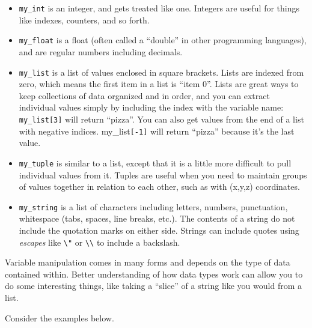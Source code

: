 \begin{itemize}
\tightlist
\item
  \texttt{my\_int} is an integer, and gets treated like one. Integers
  are useful for things like indexes, counters, and so forth.
\item
  \texttt{my\_float} is a float (often called a ``double'' in other
  programming languages), and are regular numbers including decimals.
\item
  \texttt{my\_list} is a list of values enclosed in square brackets.
  Lists are indexed from zero, which means the first item in a list is
  ``item 0''. Lists are great ways to keep collections of data organized
  and in order, and you can extract individual values simply by
  including the index with the variable name: \texttt{my\_list{[}3{]}}
  will return ``pizza''. You can also get values from the end of a list
  with negative indices. my\_list\texttt{{[}-1{]}} will return ``pizza''
  because it's the last value.
\item
  \texttt{my\_tuple} is similar to a list, except that it is a little
  more difficult to pull individual values from it. Tuples are useful
  when you need to maintain groups of values together in relation to
  each other, such as with (x,y,z) coordinates.
\item
  \texttt{my\_string} is a list of characters including letters,
  numbers, punctuation, whitespace (tabs, spaces, line breaks, etc.).
  The contents of a string do not include the quotation marks on either
  side. Strings can include quotes using \emph{escapes} like
  \texttt{\textbackslash{}"} or
  \texttt{\textbackslash{}\textbackslash{}} to include a backslash.
\end{itemize}

Variable manipulation comes in many forms and depends on the type of
data contained within. Better understanding of how data types work can
allow you to do some interesting things, like taking a ``slice'' of a
string like you would from a list.

Consider the examples below.

